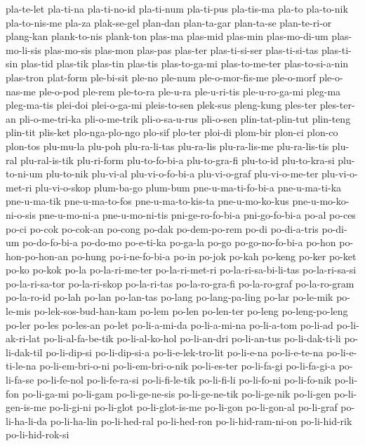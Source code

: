 {pla-te-let pla-ti-na pla-ti-no-id pla-ti-num pla-ti-pus pla-tis-ma pla-to
pla-to-nik pla-to-nis-me pla-za plak-se-gel plan-dan plan-ta-gar
plan-ta-se plan-te-ri-or plang-kan plank-to-nis plank-ton plas-ma plas-mid
plas-min plas-mo-di-um plas-mo-li-sis plas-mo-sis plas-mon plas-pas
plas-ter plas-ti-si-ser plas-ti-si-tas plas-ti-sin plas-tid plas-tik
plas-tin plas-tis plas-to-ga-mi plas-to-me-ter plas-to-si-a-nin plas-tron
plat-form ple-bi-sit ple-no ple-num ple-o-mor-fis-me ple-o-morf
ple-o-nas-me ple-o-pod ple-rem ple-to-ra ple-u-ra ple-u-ri-tis
ple-u-ro-ga-mi pleg-ma pleg-ma-tis plei-doi plei-o-ga-mi pleis-to-sen
plek-sus pleng-kung ples-ter ples-ter-an pli-o-me-tri-ka pli-o-me-trik
pli-o-sa-u-rus pli-o-sen plin-tat-plin-tut plin-teng plin-tit plis-ket
plo-nga-plo-ngo plo-sif plo-ter ploi-di plom-bir plon-ci plon-co plon-tos
plu-mu-la plu-poh plu-ra-li-tas plu-ra-lis plu-ra-lis-me plu-ra-lis-tis
plu-ral plu-ral-is-tik plu-ri-form plu-to-fo-bi-a plu-to-gra-fi plu-to-id
plu-to-kra-si plu-to-ni-um plu-to-nik plu-vi-al plu-vi-o-fo-bi-a
plu-vi-o-graf plu-vi-o-me-ter plu-vi-o-met-ri plu-vi-o-skop plum-ba-go
plum-bum pne-u-ma-ti-fo-bi-a pne-u-ma-ti-ka pne-u-ma-tik pne-u-ma-to-fos
pne-u-ma-to-kis-ta pne-u-mo-ko-kus pne-u-mo-ko-ni-o-sis pne-u-mo-ni-a
pne-u-mo-ni-tis pni-ge-ro-fo-bi-a pni-go-fo-bi-a po-al po-ces po-ci po-cok
po-cok-an po-cong po-dak po-dem-po-rem po-di po-di-a-tris po-di-um
po-do-fo-bi-a po-do-mo po-e-ti-ka po-ga-la po-go po-go-no-fo-bi-a po-hon
po-hon-po-hon-an po-hung po-i-ne-fo-bi-a po-in po-jok po-kah po-keng
po-ker po-ket po-ko po-kok po-la po-la-ri-me-ter po-la-ri-met-ri
po-la-ri-sa-bi-li-tas po-la-ri-sa-si po-la-ri-sa-tor po-la-ri-skop
po-la-ri-tas po-la-ro-gra-fi po-la-ro-graf po-la-ro-gram po-la-ro-id
po-lah po-lan po-lan-tas po-lang po-lang-pa-ling po-lar po-le-mik
po-le-mis po-lek-sos-bud-han-kam po-lem po-len po-len-ter po-leng
po-leng-po-leng po-ler po-les po-les-an po-let po-li-a-mi-da po-li-a-mi-na
po-li-a-tom po-li-ad po-li-ak-ri-lat po-li-al-fa-be-tik po-li-al-ko-hol
po-li-an-dri po-li-an-tus po-li-dak-ti-li po-li-dak-til po-li-dip-si
po-li-dip-si-a po-li-e-lek-tro-lit po-li-e-na po-li-e-te-na
po-li-e-ti-le-na po-li-em-bri-o-ni po-li-em-bri-o-nik po-li-es-ter
po-li-fa-gi po-li-fa-gi-a po-li-fa-se po-li-fe-nol po-li-fe-ra-si
po-li-fi-le-tik po-li-fi-li po-li-fo-ni po-li-fo-nik po-li-fon po-li-ga-mi
po-li-gam po-li-ge-ne-sis po-li-ge-ne-tik po-li-ge-nik po-li-gen
po-li-gen-is-me po-li-gi-ni po-li-glot po-li-glot-is-me po-li-gon
po-li-gon-al po-li-graf po-li-ha-li-da po-li-ha-lin po-li-hed-ral
po-li-hed-ron po-li-hid-ram-ni-on po-li-hid-rik po-li-hid-rok-si
}
